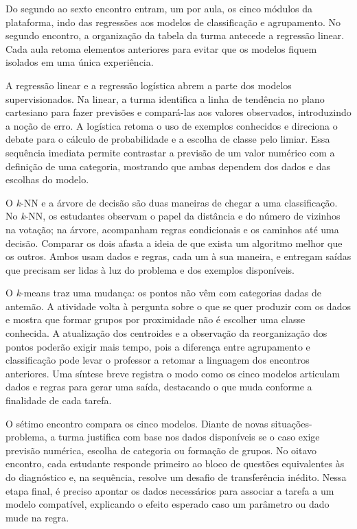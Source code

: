 Do segundo ao sexto encontro entram, um por aula, os cinco módulos da plataforma, indo das regressões aos modelos de classificação e agrupamento. No segundo encontro, a organização da tabela da turma antecede a regressão linear. Cada aula retoma elementos anteriores para evitar que os modelos fiquem isolados em uma única experiência.

A regressão linear e a regressão logística abrem a parte dos modelos supervisionados. Na linear, a turma identifica a linha de tendência no plano cartesiano para fazer previsões e compará-las aos valores observados, introduzindo a noção de erro. A logística retoma o uso de exemplos conhecidos e direciona o debate para o cálculo de probabilidade e a escolha de classe pelo limiar. Essa sequência imediata permite contrastar a previsão de um valor numérico com a definição de uma categoria, mostrando que ambas dependem dos dados e das escolhas do modelo.

O \textit{k}-NN e a árvore de decisão são duas maneiras de chegar a uma classificação. No \textit{k}-NN, os estudantes observam o papel da distância e do número de vizinhos na votação; na árvore, acompanham regras condicionais e os caminhos até uma decisão. Comparar os dois afasta a ideia de que exista um algoritmo melhor que os outros. Ambos usam dados e regras, cada um à sua maneira, e entregam saídas que precisam ser lidas à luz do problema e dos exemplos disponíveis.

O \textit{k}-means traz uma mudança: os pontos não vêm com categorias dadas de antemão. A atividade volta à pergunta sobre o que se quer produzir com os dados e mostra que formar grupos por proximidade não é escolher uma classe conhecida. A atualização dos centroides e a observação da reorganização dos pontos poderão exigir mais tempo, pois a diferença entre agrupamento e classificação pode levar o professor a retomar a linguagem dos encontros anteriores. Uma síntese breve registra o modo como os cinco modelos articulam dados e regras para gerar uma saída, destacando o que muda conforme a finalidade de cada tarefa.

O sétimo encontro compara os cinco modelos. Diante de novas situações-problema, a turma justifica com base nos dados disponíveis se o caso exige previsão numérica, escolha de categoria ou formação de grupos. No oitavo encontro, cada estudante responde primeiro ao bloco de questões equivalentes às do diagnóstico e, na sequência, resolve um desafio de transferência inédito. Nessa etapa final, é preciso apontar os dados necessários para associar a tarefa a um modelo compatível, explicando o efeito esperado caso um parâmetro ou dado mude na regra.

